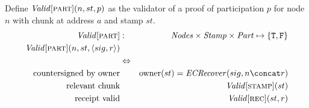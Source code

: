 \begin{definition}
\label{def:pop-validity}
Define $\mathit{Valid}[\textsc{\lowercase{PART}}](n,st,p)$ as the validator of a proof of participation $p$ for node $n$ with chunk at address $a$ and stamp $st$.
\begin{eqnarray}
\mathit{Valid}[\textsc{\lowercase{PART}}]  &:& \mathit{Nodes}\times\mathit{Stamp}\times\mathit{Part}\mapsto \{\mathtt{T,F}\}\\
\mathit{Valid}[\textsc{\lowercase{PART}}](n,st,\langle sig, r\rangle)\\
&\Leftrightarrow&\\
\text{countersigned by owner} && \mathrm{owner}(st) = \mathit{ECRecover}(sig, n\concat r) \\
\text{relevant chunk}&&\mathit{Valid}[\textsc{\lowercase{STAMP}}](st)\\   
\text{receipt valid}&&\mathit{Valid}[\textsc{\lowercase{REC}}](st,r)
\end{eqnarray}
\end{definition}
